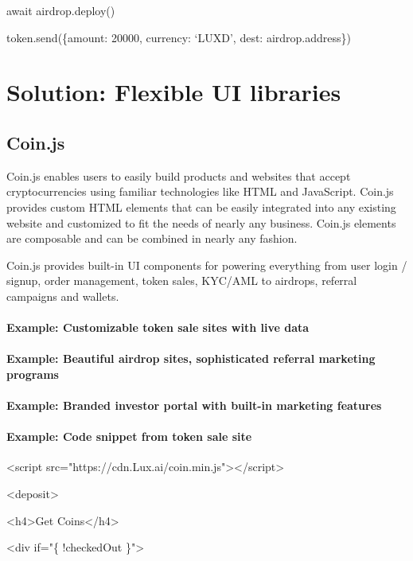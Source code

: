 \documentclass[11pt]{article}
\begin{document}
await airdrop.deploy()


token.send(\{amount: 20000, currency: `LUXD', dest: airdrop.address\})


\section{Solution: Flexible UI libraries}

\subsection{Coin.js}

Coin.js enables users to easily build products and websites that accept cryptocurrencies using familiar technologies like HTML and JavaScript. Coin.js provides custom HTML elements that can be easily integrated into any existing website and customized to fit the needs of nearly any business. Coin.js elements are composable and can be combined in nearly any fashion.


Coin.js provides built-in UI components for powering everything from user login / signup, order management, token sales, KYC/AML to airdrops, referral campaigns and wallets.


\paragraph{Example: Customizable token sale sites with live data}

\paragraph{Example: Beautiful airdrop sites, sophisticated referral marketing programs}

\paragraph{Example: Branded investor portal with built-in marketing features}

\paragraph{Example: Code snippet from token sale site}

<script src="https://cdn.Lux.ai/coin.min.js"></script>


<deposit>


<h4>Get Coins</h4>


<div if="\{ !checkedOut \}">
\end{document}
